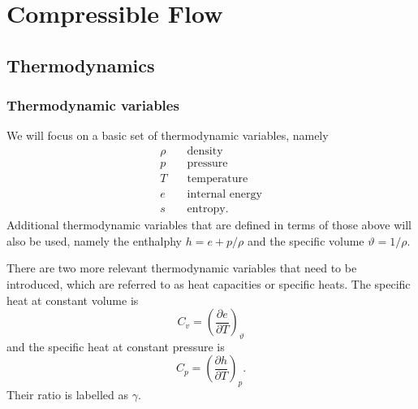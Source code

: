 \documentclass[oneside,a4paper,11pt]{report}
\begin{document}
\part{Compressible Flow}

\chapter{Thermodynamics}

\section{Thermodynamic variables}
We will focus on a basic set of thermodynamic variables, namely 
\begin{align}
    \rho & \quad \text{density} \nonumber \\
    p & \quad \text{pressure} \nonumber \\
    T & \quad \text{temperature} \nonumber \\
    e & \quad \text{internal energy} \nonumber \\
    s & \quad \text{entropy}. \nonumber
\end{align}
Additional thermodynamic variables that are defined in terms of those above will also be used, namely the enthalphy $h = e + p/\rho$ and the specific volume $\vartheta = 1/\rho$.

There are two more relevant thermodynamic variables that need to be introduced, which are referred to as heat capacities or specific heats. The specific heat at constant volume is
\begin{equation}
    C_v = \left( \frac{\partial e}{\partial T} \right)_\vartheta
\end{equation}
and the specific heat at constant pressure is
\begin{equation}
    C_p = \left ( \frac{\partial h}{\partial T} \right)_p.
\end{equation}
Their ratio is labelled as $\gamma$.

\end{document}
